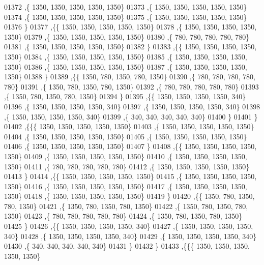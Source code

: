 \begin{DoxyCode}
01372    ,\{  1350,  1350,  1350,  1350,  1350\}
01373    ,\{  1350,  1350,  1350,  1350,  1350\}
01374    ,\{  1350,  1350,  1350,  1350,  1350\}
01375    ,\{  1350,  1350,  1350,  1350,  1350\}
01376    \}
01377   ,\{\{  1350,  1350,  1350,  1350,  1350\}
01378    ,\{  1350,  1350,  1350,  1350,  1350\}
01379    ,\{  1350,  1350,  1350,  1350,  1350\}
01380    ,\{   780,   780,   780,   780,   780\}
01381    ,\{  1350,  1350,  1350,  1350,  1350\}
01382    \}
01383   ,\{\{  1350,  1350,  1350,  1350,  1350\}
01384    ,\{  1350,  1350,  1350,  1350,  1350\}
01385    ,\{  1350,  1350,  1350,  1350,  1350\}
01386    ,\{  1350,  1350,  1350,  1350,  1350\}
01387    ,\{  1350,  1350,  1350,  1350,  1350\}
01388    \}
01389   ,\{\{  1350,   780,  1350,   780,  1350\}
01390    ,\{   780,   780,   780,   780,   780\}
01391    ,\{  1350,   780,  1350,   780,  1350\}
01392    ,\{   780,   780,   780,   780,   780\}
01393    ,\{  1350,   780,  1350,   780,  1350\}
01394    \}
01395   ,\{\{  1350,  1350,  1350,  1350,   340\}
01396    ,\{  1350,  1350,  1350,  1350,   340\}
01397    ,\{  1350,  1350,  1350,  1350,   340\}
01398    ,\{  1350,  1350,  1350,  1350,   340\}
01399    ,\{   340,   340,   340,   340,   340\}
01400    \}
01401   \}
01402  ,\{\{\{  1350,  1350,  1350,  1350,  1350\}
01403    ,\{  1350,  1350,  1350,  1350,  1350\}
01404    ,\{  1350,  1350,  1350,  1350,  1350\}
01405    ,\{  1350,  1350,  1350,  1350,  1350\}
01406    ,\{  1350,  1350,  1350,  1350,  1350\}
01407    \}
01408   ,\{\{  1350,  1350,  1350,  1350,  1350\}
01409    ,\{  1350,  1350,  1350,  1350,  1350\}
01410    ,\{  1350,  1350,  1350,  1350,  1350\}
01411    ,\{   780,   780,   780,   780,   780\}
01412    ,\{  1350,  1350,  1350,  1350,  1350\}
01413    \}
01414   ,\{\{  1350,  1350,  1350,  1350,  1350\}
01415    ,\{  1350,  1350,  1350,  1350,  1350\}
01416    ,\{  1350,  1350,  1350,  1350,  1350\}
01417    ,\{  1350,  1350,  1350,  1350,  1350\}
01418    ,\{  1350,  1350,  1350,  1350,  1350\}
01419    \}
01420   ,\{\{  1350,   780,  1350,   780,  1350\}
01421    ,\{  1350,   780,  1350,   780,  1350\}
01422    ,\{  1350,   780,  1350,   780,  1350\}
01423    ,\{   780,   780,   780,   780,   780\}
01424    ,\{  1350,   780,  1350,   780,  1350\}
01425    \}
01426   ,\{\{  1350,  1350,  1350,  1350,   340\}
01427    ,\{  1350,  1350,  1350,  1350,   340\}
01428    ,\{  1350,  1350,  1350,  1350,   340\}
01429    ,\{  1350,  1350,  1350,  1350,   340\}
01430    ,\{   340,   340,   340,   340,   340\}
01431    \}
01432   \}
01433  ,\{\{\{  1350,  1350,  1350,  1350,  1350\}

\end{DoxyCode}
